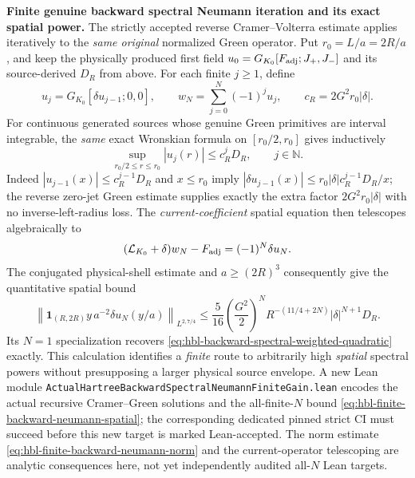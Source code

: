 \documentclass[11pt]{amsart}
\begin{document}
\medskip
\noindent\textbf{Finite genuine backward spectral Neumann iteration and its exact spatial power.}
The strictly accepted reverse Cramer--Volterra estimate applies
iteratively to the \emph{same original} normalized Green operator.
Put $r_0=L/a=2R/a$, and keep the physically produced first field
$u_0=G_{K_0}[F_{\rm adj};J_+,J_-]$ and its source-derived
$D_R$ from above. For each finite $j\ge1$, define
\[
  u_j=G_{K_0}[\delta u_{j-1};0,0],
  \qquad
  w_N=\sum_{j=0}^{N}(-1)^ju_j,\qquad
  c_R=2G^2r_0|\delta|.
\]
For continuous generated sources whose genuine Green primitives
are interval integrable, the \emph{same} exact Wronskian
formula on $[r_0/2,r_0]$ gives inductively
\begin{equation}
 \sup_{r_0/2\le r\le r_0}|u_j(r)|
 \le c_R^j D_R,\qquad j\in\mathbb N.
 \label{eq:hbl-finite-backward-neumann-spatial}
\end{equation}
Indeed $|u_{j-1}(x)|\le c_R^{j-1}D_R$ and $x\le r_0$
imply
$|\delta u_{j-1}(x)|\le
 r_0|\delta|c_R^{j-1}D_R/x$;
the reverse zero-jet Green estimate supplies exactly the extra
factor $2G^2r_0|\delta|$ with no inverse-left-radius loss.
The \emph{current-coefficient} spatial equation then telescopes
algebraically to
\[
 (\mathcal L_{K_0}+\delta)w_N-F_{\rm adj}
   =(-1)^N\delta u_N.
\]
The conjugated physical-shell estimate and
$a\ge(2R)^3$ consequently give the quantitative spatial bound
\begin{equation}
 \left\|\mathbf1_{(R,2R)}
   y\,a^{-2}\delta u_N(y/a)\right\|_{L^{2,7/4}}
 \le\frac5{16}\left(\frac{G^2}{2}\right)^N
 R^{-(11/4+2N)}|\delta|^{N+1}D_R.
 \label{eq:hbl-finite-backward-neumann-norm}
\end{equation}
Its $N=1$ specialization recovers
\eqref{eq:hbl-backward-spectral-weighted-quadratic} exactly.
This calculation identifies a \emph{finite} route to arbitrarily high
\emph{spatial} spectral powers without presupposing a larger physical
source envelope. A new Lean module
\texttt{ActualHartreeBackwardSpectralNeumannFiniteGain.lean}
encodes the actual recursive Cramer--Green solutions and the
all-finite-$N$ bound \eqref{eq:hbl-finite-backward-neumann-spatial};
the corresponding dedicated pinned strict CI must succeed before
this new target is marked Lean-accepted.
The norm estimate \eqref{eq:hbl-finite-backward-neumann-norm}
and the current-operator telescoping are analytic consequences here,
not yet independently audited all-$N$ Lean targets.
\end{document}
